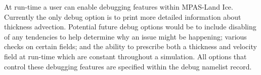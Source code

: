 At run-time a user can enable debugging features within MPAS-Land Ice. 
Currently the only debug option is to print more detailed information about
thickness advection.
Potential future debug options would be to include disabling of any 
tendencies to help determine why an issue might
be happening; various checks on certain fields;
and the ability to prescribe both a thickness and velocity field at run-time
which are constant throughout a simulation. All options that control these
debugging features are specified within the debug namelist record.
